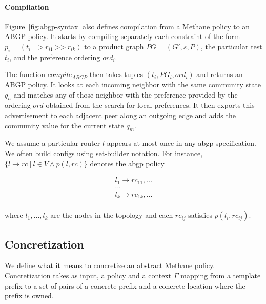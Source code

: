 \documentclass[twocolumn, openany]{sig-alternate-10pt}
\newcommand{\sysname}{{\small \sf Methane}\xspace}
\newcommand{\para}[1]{\paragraph*{\textbf{#1}}}
\newcommand{\Prefer}{\texttt{>>}}
\newcommand{\Path}{\texttt{=>}}
\begin{document}
\para{Compilation}

Figure~\ref{fig:abgp-syntax} also defines compilation from a \sysname policy to an ABGP policy. It starts by compiling separately each constraint of the form $p_i = (t_i ~\Path~ r_{i1} ~\Prefer~ r_{ik})$ to a product graph $PG = (G', s, P)$, the particular test $t_i$, and the preference ordering $ord_i$. 

The function $compile_{ABGP}$ then takes tuples $(t_i, PG_i, ord_i)$ and returns an ABGP policy. It looks at each incoming neighbor with the same community state $q_n$ and matches any of those neighbor with the preference provided by the ordering $ord$ obtained from the search for local preferences. It then exports this advertisement to each adjacent peer along an outgoing edge and adds the community value for the current state $q_m$.

\vspace{1em}

We assume a particular router $l$ appears at most once in any abgp specification.
We often build configs using set-builder notation.  For instance,
$\{l \rightarrow rc ~\vert~ l \in V \wedge p(l,rc)\}$ denotes the abgp policy

\[ \begin{array}{c}
  l_1 \rightarrow rc_{11},... \\
  ...           \\
  l_k \rightarrow rc_{1k},... \\
\end{array} \]


where $l_1, ..., l_k$ are the nodes in the topology
and each $rc_{ij}$ satisfies $p(l_i,rc_{ij})$.


\subsection{Concretization}

We define what it means to concretize an abstract \sysname policy. 
Concretization takes as input, a policy and a context $\Gamma$ mapping from a template prefix to a set of pairs of a concrete prefix and a concrete location where the prefix is owned.
\end{document}
